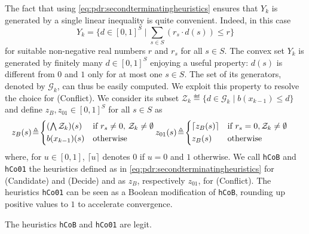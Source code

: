 The fact that using \eqref{eq:pdr:secondterminatingheuristics} ensures that $Y_k$ is generated by a single linear inequality is quite convenient. Indeed, in this case
\[
Y_k=\{d\in [0,1]^S \mid \sum_{s\in S}(r_s \cdot d(s)) \leq r \}
\]
for suitable non-negative real numbers $r$ and $r_s$ for all $s\in S$.
The convex set $Y_k$ is generated by finitely many $d\in [0,1]^S$ enjoying a useful property: $d(s)$ is different from $0$ and $1$ only for at most one $s\in S$. The set of its generators, denoted by $\mathcal{G}_k$, can thus be easily computed. We exploit this property to resolve the choice for (Conflict). We consider  its subset $\mathcal{Z}_k \eqdef \{d \in \mathcal{G}_k \mid b(x_{k-1}) \leq d\}$ and define $z_{B}, z_{01}\in[0,1]^S$ for all $s\in S$ as
\begin{equation}\label{eq:pdr:heuristicsZConflict}
	\hspace{-10pt}z_{B}(s) \!\eqdef\!
	\begin{cases*}
		(\bigwedge \mathcal{Z}_k)(s) & if $r_s \neq 0$, $\mathcal{Z}_k\neq\emptyset$ \\
		b(x_{k-1})(s)                & otherwise
	\end{cases*}
	\hspace{-4pt}z_{01}(s) \!\eqdef\!
	\begin{cases*}
		\lceil z_{B}(s)\rceil & if $r_s = 0, \mathcal{Z}_k\neq\emptyset$ \\
		z_{B}(s)              & otherwise
	\end{cases*}
\end{equation}
where, for $u\in[0,1]$, $\lceil u \rceil$ denotes $0$ if $u=0$ and $1$ otherwise. We call \verb|hCoB|  and \verb|hCo01| the heuristics defined as in \eqref{eq:pdr:secondterminatingheuristics} for (Candidate) and (Decide) and as $z_{B}$, respectively $z_{01}$, for (Conflict). The heuristics \verb|hCo01| can be seen as a Boolean modification of \verb|hCoB|, rounding up positive values to $1$ to accelerate convergence.

\begin{prop}\label{prop:pdr:genlegit}
	The heuristics \verb|hCoB|  and \verb|hCo01| are legit.
\end{prop}

